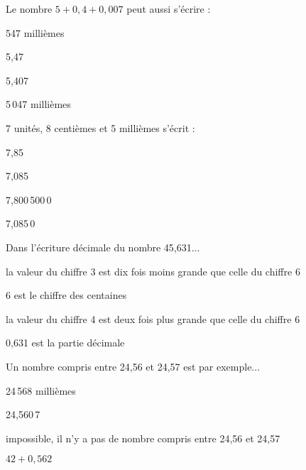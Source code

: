 \begin{QCM}
\begin{GroupeQCM}
    \begin{exercice}
      Le nombre $5 + 0,4 + 0,007$ peut aussi s'écrire :
      \begin{ChoixQCM}{4}
      \item 547 millièmes
      \item 5,47
      \item 5,407
      \item 5\,047 millièmes
      \end{ChoixQCM}
      \begin{corrige}
   \end{corrige}
    \end{exercice}
    
     \begin{exercice}
      7 unités, 8 centièmes et 5 millièmes s'écrit :
      \begin{ChoixQCM}{4}
      \item 7,85
      \item 7,085
      \item 7,800\,500\,0
      \item 7,085\,0
      \end{ChoixQCM}
      \begin{corrige}
   \end{corrige}
    \end{exercice}

     \begin{exercice}
      Dans l'écriture décimale du nombre 45,631...
      \begin{ChoixQCM}{4}
      \item la valeur du chiffre 3 est dix fois moins grande que celle du chiffre 6
      \item 6 est le chiffre des centaines
      \item la valeur du chiffre 4 est deux fois plus grande que celle du chiffre 6
      \item 0,631 est la partie décimale
      \end{ChoixQCM}
      \begin{corrige}
   \end{corrige}
    \end{exercice}

     \begin{exercice}
      Un nombre compris entre 24,56 et 24,57 est par exemple...
      \begin{ChoixQCM}{4}
      \item 24\,568 millièmes
      \item 24,560\,7
      \item impossible, il n'y a pas de nombre compris entre 24,56 et 24,57
      \item $42 + 0,562$
      \end{ChoixQCM}
      \begin{corrige}
   \end{corrige}
    \end{exercice}
    

\end{GroupeQCM}
\end{QCM}
